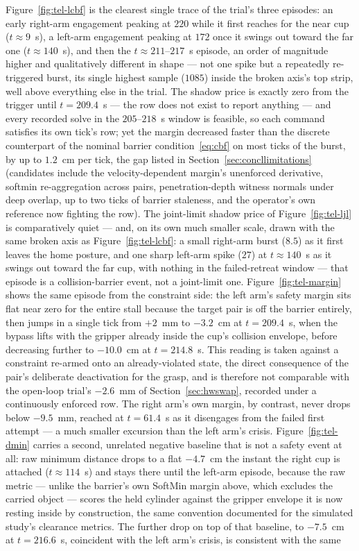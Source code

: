 Figure~\ref{fig:tel-lcbf} is the clearest single trace of the trial's three episodes: an early right-arm engagement peaking at $220$ while it first reaches for the near cup ($t\approx9$~s), a left-arm engagement peaking at $172$ once it swings out toward the far one ($t\approx140$~s), and then the $t\approx211$--$217$~s episode, an order of magnitude higher and qualitatively different in shape --- not one spike but a repeatedly re-triggered burst, its single highest sample ($1085$) inside the broken axis's top strip, well above everything else in the trial. The shadow price is exactly zero from the trigger until $t=209.4$~s --- the row does not exist to report anything --- and every recorded solve in the $205$--$218$~s window is feasible, so each command satisfies its own tick's row; yet the margin decreased faster than the discrete counterpart of the nominal barrier condition~\eqref{eq:cbf} on most ticks of the burst, by up to $1.2$~cm per tick, the gap listed in Section~\ref{sec:concllimitations} (candidates include the velocity-dependent margin's unenforced derivative, softmin re-aggregation across pairs, penetration-depth witness normals under deep overlap, up to two ticks of barrier staleness, and the operator's own reference now fighting the row). The joint-limit shadow price of Figure~\ref{fig:tel-ljl} is comparatively quiet --- and, on its own much smaller scale, drawn with the same broken axis as Figure~\ref{fig:tel-lcbf}: a small right-arm burst ($8.5$) as it first leaves the home posture, and one sharp left-arm spike ($27$) at $t\approx140$~s as it swings out toward the far cup, with nothing in the failed-retreat window --- that episode is a collision-barrier event, not a joint-limit one. Figure~\ref{fig:tel-margin} shows the same episode from the constraint side: the left arm's safety margin sits flat near zero for the entire stall because the target pair is off the barrier entirely, then jumps in a single tick from $+2$~mm to $-3.2$~cm at $t=209.4$~s, when the bypass lifts with the gripper already inside the cup's collision envelope, before decreasing further to $-10.0$~cm at $t=214.8$~s. This reading is taken against a constraint re-armed onto an already-violated state, the direct consequence of the pair's deliberate deactivation for the grasp, and is therefore not comparable with the open-loop trial's $-2.6$~mm of Section~\ref{sec:hwswap}, recorded under a continuously enforced row. The right arm's own margin, by contrast, never drops below $-9.5$~mm, reached at $t=61.4$~s as it disengages from the failed first attempt --- a much smaller excursion than the left arm's crisis. Figure~\ref{fig:tel-dmin} carries a second, unrelated negative baseline that is not a safety event at all: raw minimum distance drops to a flat $-4.7$~cm the instant the right cup is attached ($t\approx114$~s) and stays there until the left-arm episode, because the raw metric --- unlike the barrier's own SoftMin margin above, which excludes the carried object --- scores the held cylinder against the gripper envelope it is now resting inside by construction, the same convention documented for the simulated study's clearance metrics. The further drop on top of that baseline, to $-7.5$~cm at $t=216.6$~s, coincident with the left arm's crisis, is consistent with the same 